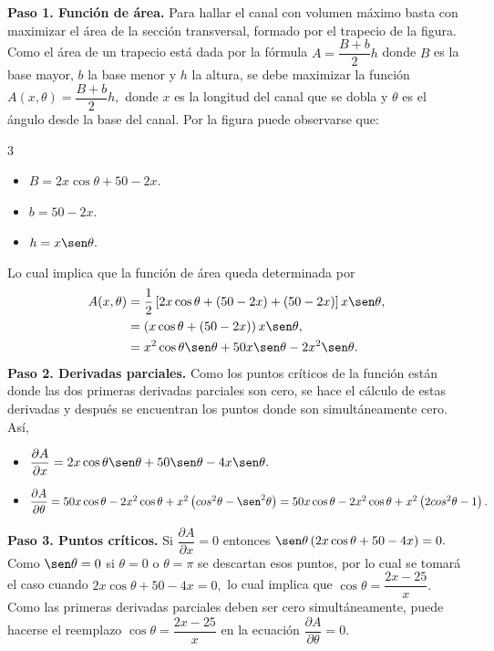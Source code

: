 \begin{prob}
\begin{myproof}
\begin{figure}[H]
\label{fig:trapecio_canal}
\end{figure}
\textbf{Paso 1. Función de área.}
Para hallar el canal con volumen máximo basta con maximizar el área de la sección transversal, formado por el trapecio de la figura. Como el área de un trapecio está dada por la fórmula $A=\dfrac{B+b}{2}h$ donde $B$ es la base mayor, $b$ la base menor y $h$ la altura, se debe maximizar la función $A(x,\theta)=\dfrac{B+b}{2}h,$ donde $x$ es la longitud del canal que se dobla y $\theta$ es el ángulo desde la base del canal.
Por la figura puede observarse que:
\begin{multicols}{3}
\begin{itemize}
\item $B=2x\cos \theta + 50-2x.$
\item $b=50-2x.$
\item $h=x\sen \theta.$
\end{itemize}
\end{multicols}
Lo cual implica que la función de área queda determinada por
\begin{align*}
A(x,\theta)&=\dfrac{1}{2}\left[ 2x\cos \theta+(50-2x)+(50-2x) \right]x\sen \theta,\\
&=\left(x\cos \theta+(50-2x)\right)x\sen \theta,\\
&=x^2\cos\theta \sen \theta+50x\sen \theta-2x^2\sen \theta.
\end{align*}
\textbf{Paso 2. Derivadas parciales.}
Como los puntos críticos de la función están donde las dos primeras derivadas parciales son cero, se hace el cálculo de estas derivadas y después se encuentran los puntos donde son simultáneamente cero. Así,
\begin{itemize}
\item $\dfrac{\partial A}{\partial x}=2x\cos\theta\sen\theta +50\sen \theta -4x\sen \theta.$
\item $\dfrac{\partial A}{\partial \theta}=50 x \cos \theta -2 x^2\cos \theta +x^2\left(cos^{2}\theta-\sen^{2}\theta\right)=50 x \cos \theta -2 x^2\cos \theta +x^2\left(2cos^{2}\theta-1\right).$  
\end{itemize}
\textbf{Paso 3. Puntos críticos.}
Si $\dfrac{\partial A}{\partial x}=0$ entonces $\sen \theta \left( 2x\cos\theta +50-4x \right)=0.$ Como $\sen \theta=0$ si $\theta =0$ o $\theta =\pi$ se descartan esos puntos, por lo cual se tomará el caso cuando $2x\cos\theta +50-4x =0,$ lo cual implica que $\cos \theta=\dfrac{2x-25}{x}.$
Como las primeras derivadas parciales deben ser cero simultáneamente, puede hacerse el reemplazo $\cos \theta=\dfrac{2x-25}{x}$ en la ecuación $\dfrac{\partial A}{\partial \theta}=0.$ 

\end{myproof}
\end{prob}

